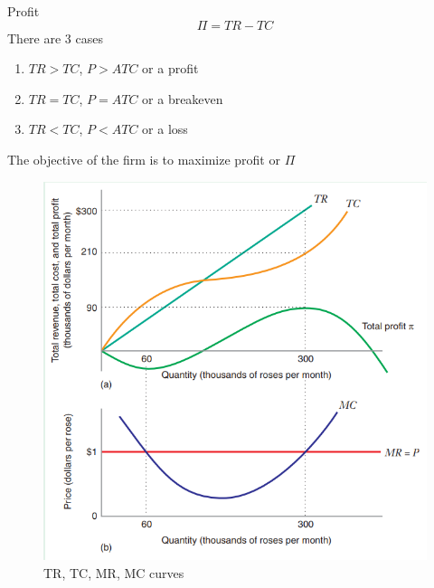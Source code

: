 \documentclass[../ECON-281-Notes.tex]{subfiles}
\begin{document}
\begin{Definition}
  {Profit}
  \begin{equation}
    \Pi = TR - TC 
  \end{equation}
  There are 3 cases 
  \begin{enumerate}
    \item $TR > TC$, $P > ATC$ or a profit
    \item $TR =  TC$, $P = ATC$ or a breakeven
    \item $TR < TC$, $P < ATC$ or a loss
  \end{enumerate}
  The objective of the firm is to maximize profit or $\Pi$ 

\end{Definition}
\begin{figure}[!h]
  \centering
  \includegraphics[width=\columnwidth]{../assets/PC-cost-curves.png}
  \caption{TR, TC, MR, MC curves}
  \label{fig:TR_TC_MR_MC_curves}
\end{figure}
\end{document}
